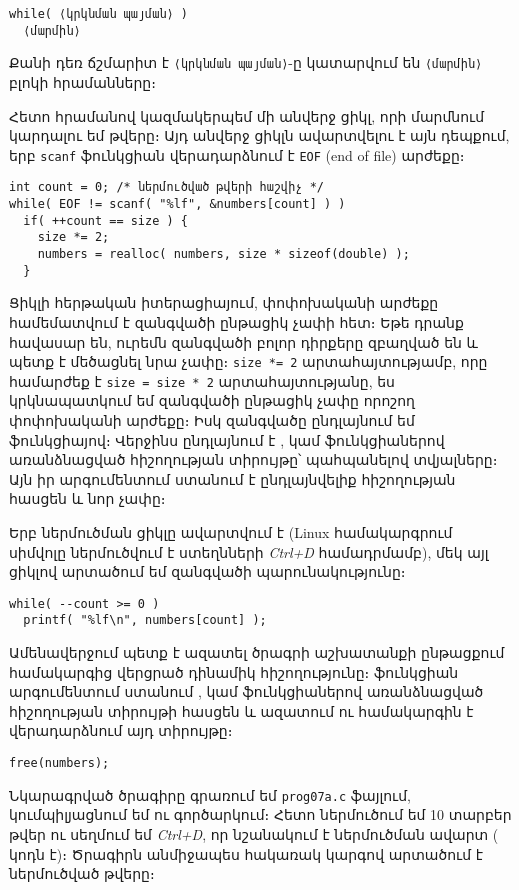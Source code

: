 \begin{verbatim}
while( ⟨կրկնման պայման⟩ )
  ⟨մարմին⟩
\end{verbatim}

Քանի դեռ ճշմարիտ է \texttt{⟨կրկնման\ պայման⟩}-ը կատարվում են
\texttt{⟨մարմին⟩} բլոկի հրամանները։

Հետո  հրամանով կազմակերպեմ մի անվերջ ցիկլ, որի մարմնում
կարդալու եմ թվերը։ Այդ անվերջ ցիկլն ավարտվելու է այն դեպքում, երբ
\texttt{scanf} ֆունկցիան վերադարձնում է \texttt{EOF} (end of file)
արժեքը։

\begin{Verbatim}
int count = 0; /* ներմուծված թվերի հաշվիչ */
while( EOF != scanf( "%lf", &numbers[count] ) )
  if( ++count == size ) {
    size *= 2;
    numbers = realloc( numbers, size * sizeof(double) );
  }
\end{Verbatim}

Ցիկլի հերթական իտերացիայում,  փոփոխականի արժեքը
համեմատվում է զանգվածի ընթացիկ չափի հետ։ Եթե դրանք հավասար են, ուրեմն
զանգվածի բոլոր դիրքերը զբաղված են և պետք է մեծացնել նրա չափը։
\texttt{size *= 2} արտահայտությամբ, որը համարժեք է
\texttt{size = size * 2} արտահայտությանը, ես կրկնապատկում եմ
զանգվածի ընթացիկ չափը որոշող փոփոխականի արժեքը։ Իսկ 
զանգվածը ընդլայնում եմ  ֆունկցիայով։ Վերջինս ընդլայնում
է ,  կամ  ֆունկցիաներով
առանձնացված հիշողության տիրույթը՝ պահպանելով տվյալները։ Այն իր
արգումենտում ստանում է ընդլայնվելիք հիշողության հասցեն և նոր չափը։

Երբ ներմուծման ցիկլը ավարտվում է (Linux համակարգրում 
սիմվոլը ներմուծվում է ստեղնների \textit{Ctrl+D} համադրմամբ), մեկ այլ
 ցիկլով արտածում եմ  զանգվածի
պարունակությունը։

\begin{Verbatim}
while( --count >= 0 )
  printf( "%lf\n", numbers[count] );
\end{Verbatim}

Ամենավերջում պետք է ազատել ծրագրի աշխատանքի ընթացքում համակարգից
վերցրած դինամիկ հիշողությունը։  ֆունկցիան արգումենտում
ստանում ,  կամ 
ֆունկցիաներով առանձնացված հիշողության տիրույթի հասցեն և ազատում ու
համակարգին է վերադարձնում այդ տիրույթը։

\begin{Verbatim}
free(numbers);
\end{Verbatim}

Նկարագրված ծրագիրը գրառում եմ \texttt{prog07a.c} ֆայլում, կումպիլյացնում
եմ ու գործարկում։ Հետո ներմուծում եմ 10 տարբեր թվեր ու սեղմում եմ
\textit{Ctrl+D}, որ նշանակում է ներմուծման ավարտ ( կոդն է)։
Ծրագիրն անմիջապես հակառակ կարգով արտածում է ներմուծված թվերը։

